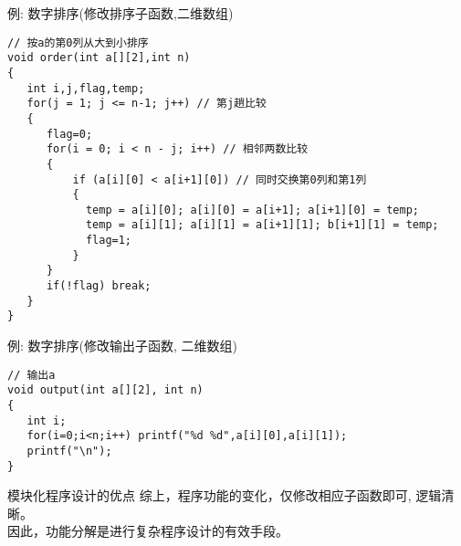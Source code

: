 \begin{frame}{例: 数字排序(修改排序子函数,二维数组)}
\begin{lstlisting}
// 按a的第0列从大到小排序
void order(int a[][2],int n)
{
   int i,j,flag,temp;
   for(j = 1; j <= n-1; j++) // 第j趟比较
   {
      flag=0;
      for(i = 0; i < n - j; i++) // 相邻两数比较
      {
          if (a[i][0] < a[i+1][0]) // 同时交换第0列和第1列
          { 
            temp = a[i][0]; a[i][0] = a[i+1]; a[i+1][0] = temp; 
            temp = a[i][1]; a[i][1] = a[i+1][1]; b[i+1][1] = temp; 
            flag=1;
          }
      }
      if(!flag) break;
   }
}
\end{lstlisting}
\end{frame}

\begin{frame}{例: 数字排序(修改输出子函数, 二维数组)}
\begin{lstlisting}
// 输出a
void output(int a[][2], int n)
{
   int i;
   for(i=0;i<n;i++) printf("%d %d",a[i][0],a[i][1]);
   printf("\n");
}
\end{lstlisting}

\begin{block}{模块化程序设计的优点}
	综上，程序功能的变化，仅修改相应子函数即可, 逻辑清晰。\\
	因此，功能分解是进行复杂程序设计的有效手段。
\end{block}
\end{frame}






